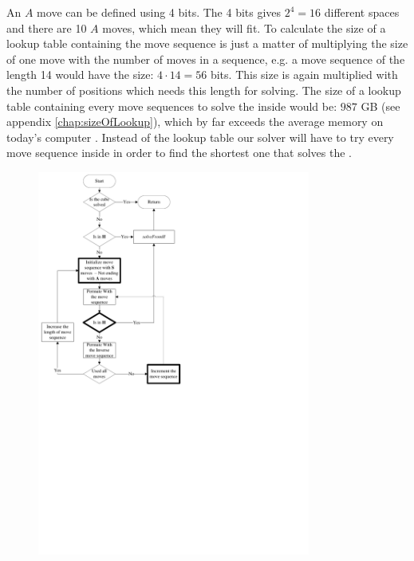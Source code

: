 An $A$ move can be defined using 4 bits.
The 4 bits gives $2^4=16$ different spaces and there are 10 $A$ moves, which mean they will fit.
To calculate the size of a lookup table containing the move sequence is just a matter of multiplying the size of one move with the number of moves in a sequence, e.g. a move sequence of the length 14 would have the size: $4 \cdot 14 = 56$ bits.
This size is again multiplied with the number of positions which needs this length for solving.
The size of a lookup table containing every move sequences to solve the \rubik{} inside  would be: $987$ GB (see appendix \ref{chap:sizeOfLookup}), which by far exceeds the average memory on today's computer \cite{averageRAM} \cite{maxRAM2}.
Instead of the lookup table our solver will have to try every move sequence inside  in order to find the shortest one that solves the \rubik{}.
\begin{figure}[htbp]
	\centering
			\includegraphics[width = 0.8\textwidth, trim = 0mm 130mm 100mm 0mm, clip]{input/pics/kociambav2.pdf}
	\caption{}
	\label{fig:kociembaFlow}
\end{figure}


